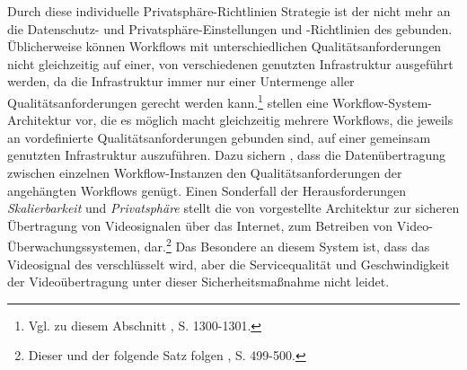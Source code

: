 Durch diese individuelle Privatsphäre-Richtlinien Strategie ist der \CSU nicht mehr an die Datenschutz- und Privatsphäre-Einstellungen und -Richtlinien des \CSPs gebunden.
\newline
\newline
Üblicherweise können Workflows mit unterschiedlichen Qualitätsanforderungen nicht\linebreak 
gleichzeitig auf einer, von verschiedenen \CSUn genutzten \CC Infrastruktur ausgeführt werden, da die \CC Infrastruktur immer nur einer Untermenge aller Qualitätsanforderungen gerecht werden kann.\footnote{Vgl. zu diesem Abschnitt \cite{TolosanaCalasanz.2012}, S. 1300-1301.}
\linebreak
\cite{TolosanaCalasanz.2012} stellen eine Workflow-System-Architektur vor, die es möglich macht gleichzeitig mehrere Workflows, die jeweils an vordefinierte Qualitätsanforderungen gebunden sind, auf einer gemeinsam genutzten \CC Infrastruktur auszuführen. Dazu sichern \cite{TolosanaCalasanz.2012}, dass die Datenübertragung zwischen einzelnen Workflow-Instanzen den Qualitätsanforderungen der angehängten Workflows genügt.
\newline
Einen Sonderfall der Herausforderungen \emph{Skalierbarkeit} und \emph{Privatsphäre} stellt die von \cite{Chang.2012a} vorgestellte Architektur zur sicheren Übertragung von Videosignalen über das Internet, zum Betreiben von Video-Überwachungssystemen, dar.\footnote{Dieser und der folgende Satz folgen \cite{Chang.2012a}, S. 499-500.}
Das Besondere an diesem System ist, dass das Videosignal des \CSUs verschlüsselt wird, aber die Servicequalität und Geschwindigkeit der Videoübertragung unter dieser Sicherheitsmaßnahme nicht leidet.

